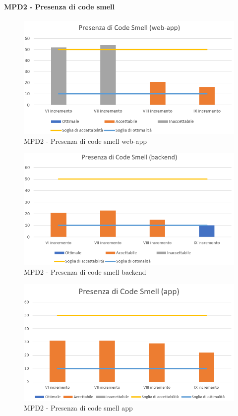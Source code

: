  \clearpage
  \paragraph{MPD2 - Presenza di code smell}
  \begin{figure}[h!]
    \centering
      \includegraphics[scale=1]{Immagini/CodeSmell WAA.PNG}
    \caption{MPD2 - Presenza di code smell web-app}
  \end{figure}

  \begin{figure}[h!]
    \centering
      \includegraphics[scale=1]{Immagini/CodeSmell BEA.PNG}
    \caption{MPD2 - Presenza di code smell backend}
  \end{figure}

  \begin{figure}[h!]
    \centering
      \includegraphics[scale=1]{Immagini/CodeSmell APPA.PNG}
    \caption{MPD2 - Presenza di code smell app}
  \end{figure}



